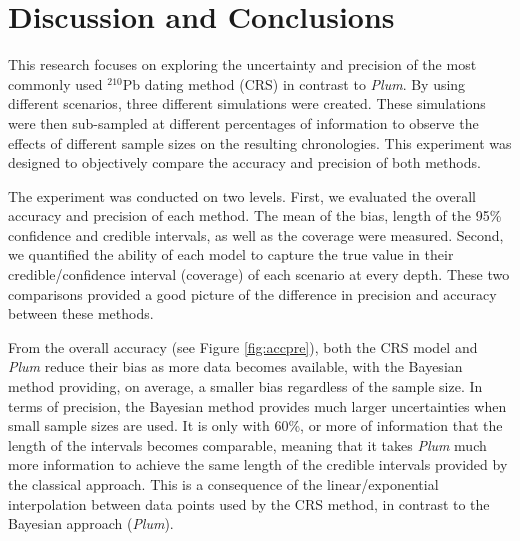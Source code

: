 \documentclass [10pt] {article}
\begin{document}
\section{Discussion and Conclusions}

This research focuses on exploring the uncertainty and precision of the most commonly used $^{210}$Pb dating method (CRS) in contrast to \textit{Plum}.
By using different scenarios, three different simulations were created. These simulations were then sub-sampled at different percentages of information to observe the effects of different sample sizes on the resulting chronologies. This experiment was designed to objectively compare the accuracy and precision of both methods.


The experiment was conducted on two levels.
First, we evaluated the overall accuracy and precision of each method.
The mean of the bias, length of the 95\% confidence and credible intervals, as well as the coverage were measured.
Second, we quantified the ability of each model to capture the true value in their credible/confidence interval (coverage) of each scenario at every depth. These two comparisons provided a good picture of the difference in precision and accuracy between these methods.


From the overall accuracy (see Figure \ref{fig:accpre}), both the CRS model and \textit{Plum} reduce their bias as more data becomes available, with the Bayesian method providing, on average, a smaller bias regardless of the sample size. 
In terms of precision, the Bayesian method provides much larger uncertainties when small sample sizes are used. 
It is only with 60\%, or more of information that the length of the intervals becomes comparable, meaning that it takes \textit{Plum} much more information to achieve the same length of the credible intervals provided by the classical approach. 
This is a consequence of the linear/exponential interpolation between data points used by the CRS method, in contrast to the Bayesian approach (\textit{Plum}).  
\end{document}
